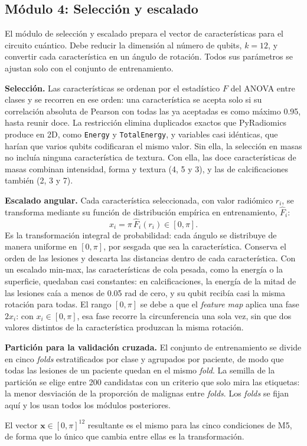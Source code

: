 
\subsection{Módulo 4: Selección y escalado}

El módulo de selección y escalado prepara el vector de características para el circuito cuántico.
Debe reducir la dimensión al número de qubits, $k = 12$, y convertir cada característica en un
ángulo de rotación. Todos sus parámetros se ajustan solo con el conjunto de entrenamiento.

\textbf{Selección.} Las características se ordenan por el estadístico $F$ del ANOVA entre clases y
se recorren en ese orden: una característica se acepta solo si su correlación absoluta de Pearson
con todas las ya aceptadas es como máximo 0.95, hasta reunir doce. La restricción elimina
duplicados exactos que PyRadiomics produce en 2D, como \texttt{Energy} y \texttt{TotalEnergy}, y
variables casi idénticas, que harían que varios qubits codificaran el mismo valor. Sin ella, la
selección en masas no incluía ninguna característica de textura. Con ella, las doce características
de masas combinan intensidad, forma y textura (4, 5 y 3), y las de calcificaciones también (2, 3 y 7).

\textbf{Escalado angular.} Cada característica seleccionada, con valor radiómico $r_i$, se transforma
mediante su función de distribución empírica en entrenamiento, $\hat F_i$:
\begin{equation}
  x_i = \pi\,\hat F_i(r_i) \in [0,\pi].
  \label{eq:quantile_scaling}
\end{equation}
Es la transformación integral de probabilidad: cada ángulo se distribuye de manera uniforme en
$[0,\pi]$, por sesgada que sea la característica. Conserva el orden de las lesiones y descarta las
distancias dentro de cada característica. Con un escalado min-max, las características de cola
pesada, como la energía o la superficie, quedaban casi constantes: en calcificaciones, la energía de
la mitad de las lesiones caía a menos de 0.05 rad de cero, y su qubit recibía casi la misma rotación
para todas. El rango $[0,\pi]$ se debe a que el
\textit{feature map} aplica una fase $2x_i$: con $x_i\in[0,\pi]$, esa fase recorre la circunferencia
una sola vez, sin que dos valores distintos de la característica produzcan la misma rotación.

\textbf{Partición para la validación cruzada.} El conjunto de entrenamiento se divide en cinco
\textit{folds} estratificados por clase y agrupados por paciente, de modo que todas las lesiones de
un paciente quedan en el mismo \textit{fold}. La semilla de la partición se elige entre 200
candidatas con un criterio que solo mira las etiquetas: la menor desviación de la proporción de
malignas entre \textit{folds}. Los \textit{folds} se fijan aquí y los usan todos los módulos
posteriores.

El vector $\mathbf{x}\in[0,\pi]^{12}$ resultante es el mismo para las cinco condiciones de M5, de
forma que lo único que cambia entre ellas es la transformación.
